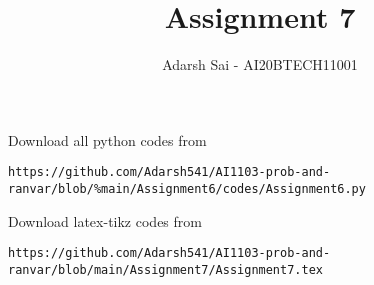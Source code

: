 \documentclass[journal,12pt,twocolumn]{IEEEtran}
\DeclareMathOperator*{\Res}{Res}
\begin{document}
\newcommand{\BEQA}{\begin{eqnarray}}
\newcommand{\EEQA}{\end{eqnarray}}
\newcommand{\define}{\stackrel{\triangle}{=}}

\raggedbottom
\setlength{\parindent}{0pt}
\providecommand{\mbf}{\mathbf}
\providecommand{\pr}[1]{\ensuremath{\Pr\left(#1\right)}}
\providecommand{\qfunc}[1]{\ensuremath{Q\left(#1\right)}}
\providecommand{\sbrak}[1]{\ensuremath{{}\left[#1\right]}}
\providecommand{\lsbrak}[1]{\ensuremath{{}\left[#1\right.}}
\providecommand{\rsbrak}[1]{\ensuremath{{}\left.#1\right]}}
\providecommand{\brak}[1]{\ensuremath{\left(#1\right)}}
\providecommand{\lbrak}[1]{\ensuremath{\left(#1\right.}}
\providecommand{\rbrak}[1]{\ensuremath{\left.#1\right)}}
\providecommand{\cbrak}[1]{\ensuremath{\left\{#1\right\}}}
\providecommand{\lcbrak}[1]{\ensuremath{\left\{#1\right.}}
\providecommand{\rcbrak}[1]{\ensuremath{\left.#1\right\}}}
\theoremstyle{remark}
\newtheorem{rem}{Remark}
\newcommand{\sgn}{\mathop{\mathrm{sgn}}}
\providecommand{\abs}[1]{\vert#1\vert}
\providecommand{\res}[1]{\Res\displaylimits_{#1}} 
\providecommand{\norm}[1]{\lVert#1\rVert}
\providecommand{\mtx}[1]{\mathbf{#1}}
\providecommand{\mean}[1]{E[ #1 ]}
\providecommand{\fourier}{\overset{\mathcal{F}}{ \rightleftharpoons}}
\providecommand{\system}{\overset{\mathcal{H}}{ \longleftrightarrow}}
\newcommand{\solution}{\noindent \textbf{Solution: }}
\newcommand{\cosec}{\,\text{cosec}\,}
\providecommand{\dec}[2]{\ensuremath{\overset{#1}{\underset{#2}{\gtrless}}}}
\newcommand{\myvec}[1]{\ensuremath{\begin{pmatrix}#1\end{pmatrix}}}
\newcommand{\mydet}[1]{\ensuremath{\begin{vmatrix}#1\end{vmatrix}}}
\makeatletter
{}
\makeatother
\let\StandardTheFigure\thefigure
\let\vec\mathbf
\renewcommand{\thefigure}{\theproblem}
\def\putbox#1#2#3{\makebox[0in][l]{\makebox[#1][l]{}\raisebox{\baselineskip}[0in][0in]{\raisebox{#2}[0in][0in]{#3}}}}
     \def\rightbox#1{\makebox[0in][r]{#1}}
     \def\centbox#1{\makebox[0in]{#1}}
     \def\topbox#1{\raisebox{-\baselineskip}[0in][0in]{#1}}
     \def\midbox#1{\raisebox{-0.5\baselineskip}[0in][0in]{#1}}
\vspace{3cm}
\title{Assignment 7}
\author{Adarsh Sai - AI20BTECH11001}
\maketitle
\newpage
\bigskip
\renewcommand{\thefigure}{\theenumi}
\renewcommand{\thetable}{\theenumi}
Download all python codes from 
\begin{lstlisting}
https://github.com/Adarsh541/AI1103-prob-and-ranvar/blob/%main/Assignment6/codes/Assignment6.py
\end{lstlisting}
%
Download latex-tikz codes from 
%
\begin{lstlisting}
https://github.com/Adarsh541/AI1103-prob-and-ranvar/blob/main/Assignment7/Assignment7.tex
\end{lstlisting}
\end{document}
